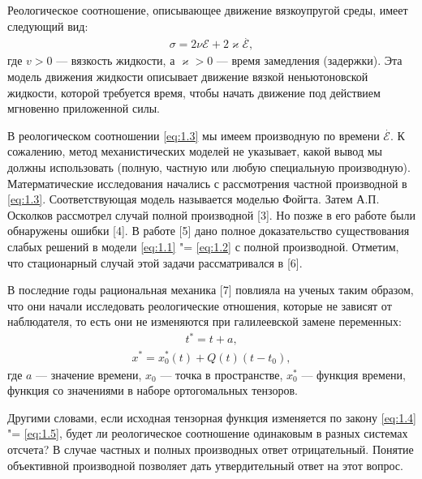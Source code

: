 Реологическое соотношение, описывающее движение вязкоупругой среды, имеет следующий вид:
\begin{equation}\label{eq:1.3}
    \begin{gathered}
        \sigma=2\nu\mathcal{E}+2\varkappa\stackrel{.}{\mathcal{E}},
    \end{gathered}
\end{equation}
где $v> 0$ --- вязкость жидкости, а $\varkappa> 0$ --- время замедления (задержки). Эта модель движения жидкости 
описывает движение вязкой неньютоновской жидкости, которой требуется время, чтобы начать движение под действием мгновенно 
приложенной силы. 

В реологическом соотношении \ref{eq:1.3} мы имеем производную по времени $\stackrel{.}{\mathcal{E}}$. К сожалению, 
метод механистических моделей не указывает, какой вывод мы должны использовать (полную, частную или любую специальную 
производную). Матерматические исследования начались с рассмотрения частной производной в \ref{eq:1.3}. 
Соответствующая модель называется моделью Фойгта. Затем А.П. Осколков рассмотрел случай полной производной [3]. 
Но позже в его работе были обнаружены ошибки [4].  В работе [5] дано полное доказательство существования слабых решений 
в модели \ref{eq:1.1} "= \ref{eq:1.2} с полной производной. Отметим, что стационарный случай этой задачи рассматривался 
в [6].

В последние годы рациональная механика [7] повлияла на ученых таким образом, что они начали исследовать реологические 
отношения, которые не зависят от наблюдателя, то есть они не изменяются при галилеевской замене переменных:
\begin{equation}\label{eq:1.4}
    \begin{gathered}
        t^*=t+a,
    \end{gathered}
\end{equation}
\begin{equation}\label{eq:1.5}
    \begin{gathered}
        x^*=x^*_0(t)+Q(t)(t-t_0),
    \end{gathered}
\end{equation}
где $a$ --- значение времени, $x_0$ --- точка в пространстве, $x^*_0$ --- функция времени, функция со значениями в наборе 
ортогомальных тензоров. 

Другими словами, если исходная тензорная функция изменяется по закону \ref{eq:1.4} "= \ref{eq:1.5}, 
будет ли реологическое соотношение одинаковым в разных системах отсчета? В случае частных и полных производных ответ 
отрицательный. Понятие объективной производной позволяет дать утвердительный ответ на этот вопрос.

